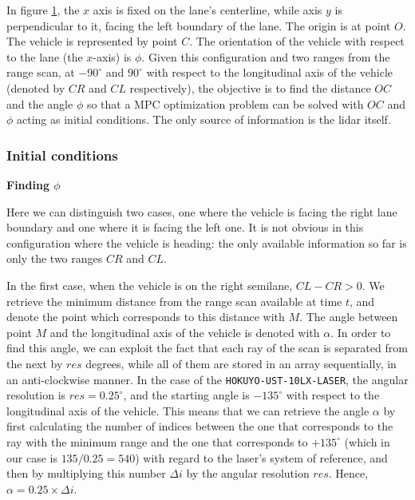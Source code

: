 In figure \ref{fig:centerline_mpc}, the $x$ axis is fixed on the lane's
centerline, while axis $y$ is perpendicular to it, facing the left boundary of
the lane. The origin is at point
$O$. The vehicle is represented by point $C$. The orientation of the vehicle
with respect to the lane (the $x$-axis) is $\phi$. Given this configuration
and two ranges from the range scan, at $-90^{\circ}$ and $90^{\circ}$ with
respect to the longitudinal axis of the vehicle (denoted by $CR$ and
$CL$ respectively), the objective is to find the distance $OC$ and the angle
$\phi$ so that a MPC optimization problem can be solved with $OC$ and $\phi$
acting as initial conditions. The only source of information is the lidar itself.

\begin{figure}[H]\centering
  \scalebox{1}{}
  \caption{}
  \label{fig:centerline_mpc}
\end{figure}


\subsubsection{Initial conditions}

\textbf{Finding $\phi$}


Here we can distinguish two cases, one where the vehicle is facing the right
lane boundary and one where it is facing the left one. It is not obvious
in this configuration where the vehicle is heading: the only available
information so far is only the two ranges $CR$ and $CL$.

In the first case, when the vehicle is on the right semilane, $CL-CR > 0$.
We retrieve the minimum distance from the range scan available at time $t$,
and denote the point which corresponds to this distance with $M$. The angle
between point $M$ and the longitudinal axis of the vehicle is denoted with
$\alpha$. In order to find this angle, we can exploit the fact that each ray
of the scan is separated from the next by $res$ degrees, while all of them
are stored in an array sequentially, in an anti-clockwise manner. In the case
of the \texttt{HOKUYO-UST-10LX-LASER}, the angular resolution is
$res=0.25^{\circ}$, and the starting angle is $-135^{\circ}$ with respect to the
longitudinal axis of the vehicle. This means that we can retrieve the angle
$\alpha$ by first calculating the number of indices between the one that
corresponds to the ray with the minimum range and the one that corresponds
to $+135^{\circ}$ (which in our case is $135 / 0.25 = 540$) with regard to the
laser's system of reference, and then by multiplying this number $\Delta i$ by
the angular resolution $res$. Hence, $\alpha = 0.25 \times \Delta i$.

